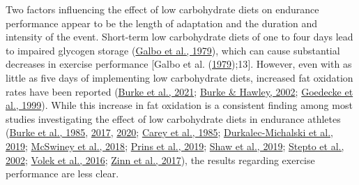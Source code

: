 \documentclass[]{cik}%
\begin{document}
Two factors influencing the effect of low carbohydrate diets on
endurance performance appear to be the length of adaptation and the
duration and intensity of the event. Short-term low carbohydrate diets
of one to four days lead to impaired glycogen storage
(\protect\hyperlink{ref-12}{Galbo et al., 1979}), which can cause
substantial decreases in exercise performance {[}Galbo et al.
(\protect\hyperlink{ref-12}{1979});13{]}. However, even with as little
as five days of implementing low carbohydrate diets, increased fat
oxidation rates have been reported (\protect\hyperlink{ref-16}{Burke et
al., 2021}; \protect\hyperlink{ref-15}{Burke \& Hawley, 2002};
\protect\hyperlink{ref-14}{Goedecke et al., 1999}). While this increase
in fat oxidation is a consistent finding among most studies
investigating the effect of low carbohydrate diets in endurance athletes
(\protect\hyperlink{ref-18}{Burke et al., 1985},
\protect\hyperlink{ref-19}{2017}, \protect\hyperlink{ref-20}{2020};
\protect\hyperlink{ref-6}{Carey et al., 1985};
\protect\hyperlink{ref-21}{Durkalec-Michalski et al., 2019};
\protect\hyperlink{ref-22}{McSwiney et al., 2018};
\protect\hyperlink{ref-23}{Prins et al., 2019};
\protect\hyperlink{ref-26}{Shaw et al., 2019};
\protect\hyperlink{ref-24}{Stepto et al., 2002};
\protect\hyperlink{ref-17}{Volek et al., 2016};
\protect\hyperlink{ref-25}{Zinn et al., 2017}), the results regarding
exercise performance are less clear.
\end{document}
